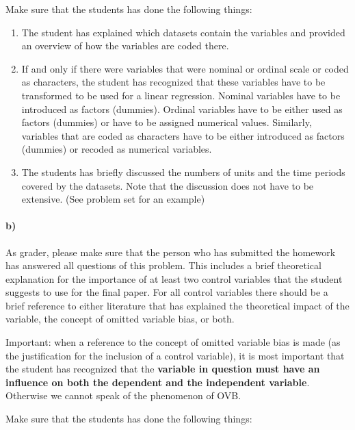 \documentclass[12pt]{article}\usepackage[]{graphicx}\usepackage[]{color}
\begin{document}
Make sure that the students has done the following things:

\begin{enumerate}
	\item The student has explained which datasets contain the variables and provided an overview of how the variables are coded there.
	\item If and only if there were variables that were nominal or ordinal scale or coded as characters, the student has recognized that these variables have to be transformed to be used for a linear regression. Nominal variables have to be introduced as factors (dummies). Ordinal variables have to be either used as factors (dummies) or have to be assigned numerical values. Similarly, variables that are coded as characters have to be either introduced as factors (dummies) or recoded as numerical variables.
	\item The students has briefly discussed the numbers of units and the time periods covered by the datasets. Note that the discussion does not have to be extensive. (See problem set for an example)
\end{enumerate}

\paragraph*{b)} As grader, please make sure that the person who has submitted the homework has answered all questions of this problem. This includes a brief theoretical explanation for the importance of at least two control variables that the student suggests to use for the final paper. For all control variables there should be a brief reference to either literature that has explained the theoretical impact of the variable, the concept of omitted variable bias, or both.

Important: when a reference to the concept of omitted variable bias is made (as the justification for the inclusion of a control variable), it is most important that the student has recognized that the \textbf{variable in question must have an influence on both the dependent and the independent variable}. Otherwise we cannot speak of the phenomenon of OVB.

Make sure that the students has done the following things:
\end{document}
